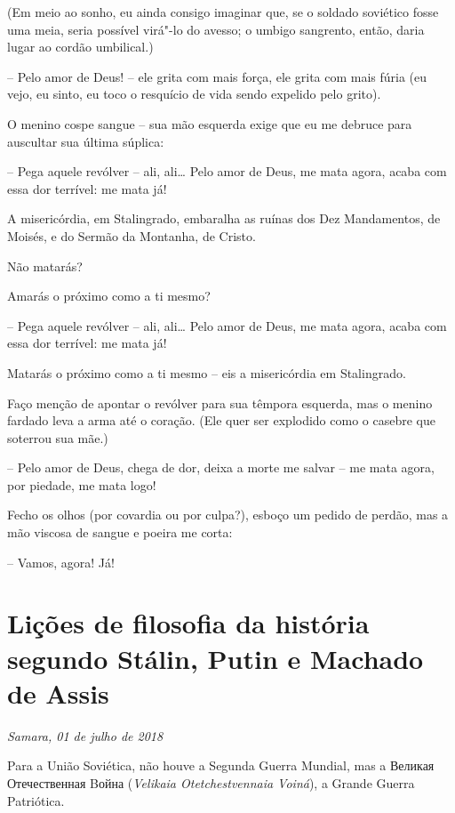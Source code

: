 (Em meio ao sonho, eu ainda consigo imaginar que, se o soldado soviético
fosse uma meia, seria possível virá"-lo do avesso; o umbigo sangrento,
então, daria lugar ao cordão umbilical.)

-- Pelo amor de Deus! -- ele grita com mais força, ele grita com mais
fúria (eu vejo, eu sinto, eu toco o resquício de vida sendo expelido
pelo grito).

O menino cospe sangue -- sua mão esquerda exige que eu me debruce para
auscultar sua última súplica:

-- Pega aquele revólver -- ali, ali\ldots{} Pelo amor de Deus, me mata agora,
acaba com essa dor terrível: me mata já!

A misericórdia, em Stalingrado, embaralha as ruínas dos Dez Mandamentos,
de Moisés, e do Sermão da Montanha, de Cristo.

Não matarás?

Amarás o próximo como a ti mesmo?

-- Pega aquele revólver -- ali, ali\ldots{} Pelo amor de Deus, me mata agora,
acaba com essa dor terrível: me mata já!

Matarás o próximo como a ti mesmo -- eis a misericórdia em Stalingrado.

Faço menção de apontar o revólver para sua têmpora esquerda, mas o
menino fardado leva a arma até o coração. (Ele quer ser explodido como o
casebre que soterrou sua mãe.)

-- Pelo amor de Deus, chega de dor, deixa a morte me salvar -- me mata
agora, por piedade, me mata logo!

Fecho os olhos (por covardia ou por culpa?), esboço um pedido de perdão,
mas a mão viscosa de sangue e poeira me corta:

-- Vamos, agora! Já!

\chapter*{Lições de filosofia da história segundo Stálin, Putin e Machado de Assis}

\begin{flushright}
\emph{Samara, 01 de julho de 2018}
\end{flushright}

Para a União Soviética, não houve a Segunda Guerra Mundial, mas a
Великая Отечественная Bойна (\emph{Velikaia Otetchestvennaia Voiná}), a
Grande Guerra Patriótica.

